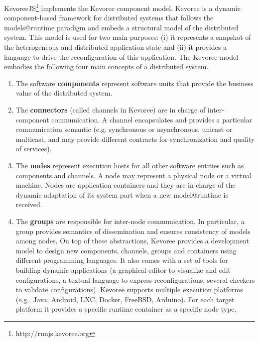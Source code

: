 KevoreeJS\footnote{http://runjs.kevoree.org}  implements the Kevoree component model. Kevoree is a dynamic component-based framework for distributed systems that follows the models@runtime paradigm and embeds a structural model of the distributed system. This model is used for two main purposes: (i) it represents a snapshot of the heterogeneous and distributed application state and (ii) it provides a language to drive the reconfiguration of this application. The Kevoree model embodies the following four main concepts of a distributed system. 

\begin{enumerate}
	\item The software \textbf{components} represent software units that provide the business value of the distributed system. 
\item The \textbf{connectors} (called channels in Kevoree) are in charge of inter-component communication. A channel encapsulates and provides a particular communication semantic (e.g. synchronous or asynchronous, unicast or multicast, and may provide different contracts for synchronization and quality of services). 
\item The \textbf{nodes} represent execution hosts for all other software entities such as components and channels. A node may represent a physical node or a virtual machine. Nodes are application containers and they are in charge of the dynamic adaptation of its system part when a new model@runtime is received. 
\item The \textbf{groups} are responsible for inter-node communication. In particular, a group provides semantics of dissemination and ensures consistency of models among nodes. On top of these abstractions, Kevoree provides a development model to design new components, channels, groups and containers using different programming languages. It also comes with a set of tools for building dynamic applications (a graphical editor to visualize and edit configurations, a textual language to express reconfigurations, several checkers to validate configurations). Kevoree supports multiple execution platforms (e.g., Java, Android, LXC, Docker, FreeBSD, Arduino). For each target platform it provides a specific runtime container as a specific node type. 

\end{enumerate}


